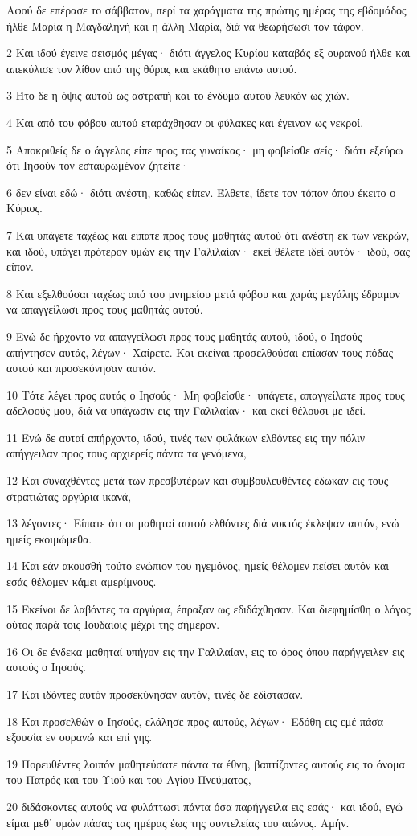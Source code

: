 \par Αφού δε επέρασε το σάββατον, περί τα χαράγματα της πρώτης ημέρας της εβδομάδος ήλθε Μαρία η Μαγδαληνή και η άλλη Μαρία, διά να θεωρήσωσι τον τάφον.
\par 2 Και ιδού έγεινε σεισμός μέγας· διότι άγγελος Κυρίου καταβάς εξ ουρανού ήλθε και απεκύλισε τον λίθον από της θύρας και εκάθητο επάνω αυτού.
\par 3 Ήτο δε η όψις αυτού ως αστραπή και το ένδυμα αυτού λευκόν ως χιών.
\par 4 Και από του φόβου αυτού εταράχθησαν οι φύλακες και έγειναν ως νεκροί.
\par 5 Αποκριθείς δε ο άγγελος είπε προς τας γυναίκας· μη φοβείσθε σείς· διότι εξεύρω ότι Ιησούν τον εσταυρωμένον ζητείτε·
\par 6 δεν είναι εδώ· διότι ανέστη, καθώς είπεν. Έλθετε, ίδετε τον τόπον όπου έκειτο ο Κύριος.
\par 7 Και υπάγετε ταχέως και είπατε προς τους μαθητάς αυτού ότι ανέστη εκ των νεκρών, και ιδού, υπάγει πρότερον υμών εις την Γαλιλαίαν· εκεί θέλετε ιδεί αυτόν· ιδού, σας είπον.
\par 8 Και εξελθούσαι ταχέως από του μνημείου μετά φόβου και χαράς μεγάλης έδραμον να απαγγείλωσι προς τους μαθητάς αυτού.
\par 9 Ενώ δε ήρχοντο να απαγγείλωσι προς τους μαθητάς αυτού, ιδού, ο Ιησούς απήντησεν αυτάς, λέγων· Χαίρετε. Και εκείναι προσελθούσαι επίασαν τους πόδας αυτού και προσεκύνησαν αυτόν.
\par 10 Τότε λέγει προς αυτάς ο Ιησούς· Μη φοβείσθε· υπάγετε, απαγγείλατε προς τους αδελφούς μου, διά να υπάγωσιν εις την Γαλιλαίαν· και εκεί θέλουσι με ιδεί.
\par 11 Ενώ δε αυταί απήρχοντο, ιδού, τινές των φυλάκων ελθόντες εις την πόλιν απήγγειλαν προς τους αρχιερείς πάντα τα γενόμενα,
\par 12 Και συναχθέντες μετά των πρεσβυτέρων και συμβουλευθέντες έδωκαν εις τους στρατιώτας αργύρια ικανά,
\par 13 λέγοντες· Είπατε ότι οι μαθηταί αυτού ελθόντες διά νυκτός έκλεψαν αυτόν, ενώ ημείς εκοιμώμεθα.
\par 14 Και εάν ακουσθή τούτο ενώπιον του ηγεμόνος, ημείς θέλομεν πείσει αυτόν και εσάς θέλομεν κάμει αμερίμνους.
\par 15 Εκείνοι δε λαβόντες τα αργύρια, έπραξαν ως εδιδάχθησαν. Και διεφημίσθη ο λόγος ούτος παρά τοις Ιουδαίοις μέχρι της σήμερον.
\par 16 Οι δε ένδεκα μαθηταί υπήγον εις την Γαλιλαίαν, εις το όρος όπου παρήγγειλεν εις αυτούς ο Ιησούς.
\par 17 Και ιδόντες αυτόν προσεκύνησαν αυτόν, τινές δε εδίστασαν.
\par 18 Και προσελθών ο Ιησούς, ελάλησε προς αυτούς, λέγων· Εδόθη εις εμέ πάσα εξουσία εν ουρανώ και επί γης.
\par 19 Πορευθέντες λοιπόν μαθητεύσατε πάντα τα έθνη, βαπτίζοντες αυτούς εις το όνομα του Πατρός και του Υιού και του Αγίου Πνεύματος,
\par 20 διδάσκοντες αυτούς να φυλάττωσι πάντα όσα παρήγγειλα εις εσάς· και ιδού, εγώ είμαι μεθ' υμών πάσας τας ημέρας έως της συντελείας του αιώνος. Αμήν.


